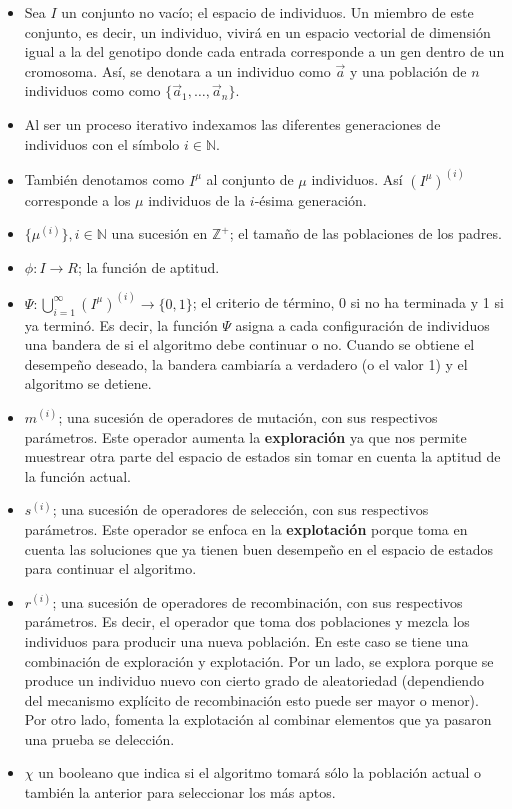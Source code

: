 \begin{itemize}
    \item Sea $I$ un conjunto no vacío; el espacio de individuos. Un miembro de este conjunto, es decir, un individuo, vivirá en un espacio vectorial de dimensión igual a la del genotipo donde cada entrada corresponde a un gen dentro de un cromosoma. Así, se denotara a un individuo como $\vec{a}$ y una población de $n$ individuos como como $\{\vec{a}_1,\ldots , \vec{a}_n\}$.
    \item Al ser un proceso iterativo indexamos las diferentes generaciones de individuos con el símbolo $i\in\mathbb{N}$.
    \item También denotamos como $I^\mu$ al conjunto de $\mu$ individuos. Así ${(I^{\mu})}^{(i)}$ corresponde a los $\mu$ individuos de la $i$-ésima generación. 
    \item $\{\mu^{(i)}\}, i\in \mathbb{N}$ una sucesión en $\mathbb{Z}^+$; el tamaño de las poblaciones de los padres. 
    \item $\phi: I\rightarrow R$; la función de aptitud.
    \item $\Psi: \bigcup_{i=1}^\infty (I^{\mu})^{(i)}\rightarrow \{0,1\}$; el criterio de término, 0 si no ha terminada y 1 si ya terminó. Es decir, la función $\Psi$ asigna a cada configuración de individuos una bandera de si el algoritmo debe continuar o no. Cuando se obtiene el desempeño deseado, la bandera cambiaría a verdadero (o el valor 1) y el algoritmo se detiene. 
    \item $m^{(i)}$; una sucesión de operadores de mutación, con sus respectivos parámetros. Este operador aumenta la \textbf{exploración} ya que nos permite muestrear otra parte del espacio de estados sin tomar en cuenta la aptitud de la función actual.
    \item $s^{(i)}$; una sucesión de operadores de selección, con sus respectivos parámetros. Este operador  se enfoca en la \textbf{explotación} porque toma en cuenta las soluciones que ya tienen buen desempeño en el espacio de estados para continuar el algoritmo. 
    \item $r^{(i)}$; una sucesión de operadores de recombinación, con sus respectivos parámetros. Es decir, el operador que toma dos poblaciones y mezcla los individuos para producir una nueva población.  En este caso se tiene una combinación de exploración y explotación. Por un lado, se explora porque se produce un individuo nuevo con cierto grado de aleatoriedad (dependiendo del mecanismo explícito de recombinación esto puede ser mayor o menor). Por otro lado, fomenta la explotación al combinar elementos que ya pasaron una prueba se delección. 
    \item $\chi$ un booleano que indica si el algoritmo tomará sólo la población actual o también la anterior para seleccionar los más aptos.
\end{itemize}

